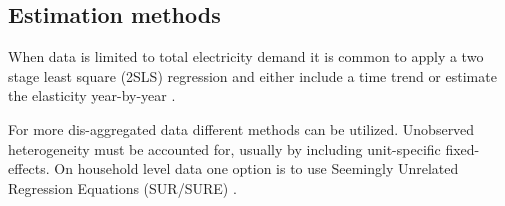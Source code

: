 \subsection{Estimation methods}
\label{subsec:b_estimation}
When data is limited to total electricity demand it is common to apply a two stage least square (2SLS) regression and either include a time trend \citep{lijesen2007real} or estimate the elasticity year-by-year \citep{bonte2015price}.
\par\vspace{-1em}
For more dis-aggregated data different methods can be utilized. Unobserved heterogeneity must be accounted for, usually by including unit-specific fixed-effects. On household level data one option is to use Seemingly Unrelated Regression Equations (SUR/SURE) \citep{vesterberg2014residential}.
